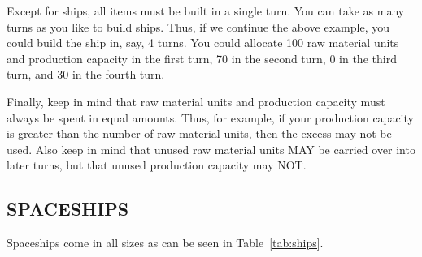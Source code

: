 \documentclass[10pt,titlepage]{article}
\begin{document}
Except for ships, all items must be built in a single turn.  You can take as
many turns as you like to build ships.  Thus, if we continue the above example,
you could build the ship in, say, 4 turns.  You could allocate 100 raw material
units and production capacity in the first turn, 70 in the second turn, 0 in
the third turn, and 30 in the fourth turn.

Finally, keep in mind that raw material units and production capacity must
always be spent in equal amounts.  Thus, for example, if your production
capacity is greater than the number of raw material units, then the excess may
not be used.  Also keep in mind that unused raw material units MAY be carried
over into later turns, but that unused production capacity may NOT.


\subsection{SPACESHIPS}
\label{sec:spaceships}


Spaceships come in all sizes as can be seen in Table~\ref{tab:ships}.
\end{document}
